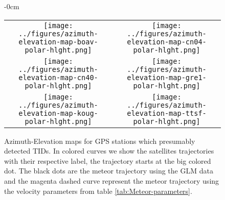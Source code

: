 \begin{figure*}
\begin{adjustwidth}{-\extralength}{0cm}
    \begin{tabular}{cc}
      \texttt{[image: ../figures/azimuth-elevation-map-boav-polar-hlght.png]}   & \texttt{[image: ../figures/azimuth-elevation-map-cn04-polar-hlght.png]} \\
            \texttt{[image: ../figures/azimuth-elevation-map-cn40-polar-hlght.png]}   & \texttt{[image: ../figures/azimuth-elevation-map-gre1-polar-hlght.png]} \\
     \texttt{[image: ../figures/azimuth-elevation-map-koug-polar-hlght.png]}   & \texttt{[image: ../figures/azimuth-elevation-map-ttsf-polar-hlght.png]} \\
    \end{tabular}
    \end{adjustwidth}
    \caption{Azimuth-Elevation maps for GPS stations which presumably detected TIDs. In colored curves we show the satellites trajectories with their respective label, the trajectory starts at the big colored dot. The black dots are the meteor trajectory using the GLM data and the magenta dashed curve represent the meteor trajectory using the velocity parameters from table \ref{tab:Meteor-parameters}.}
    \label{fig:azimuth-elevations-maps-1}
\end{figure*}

